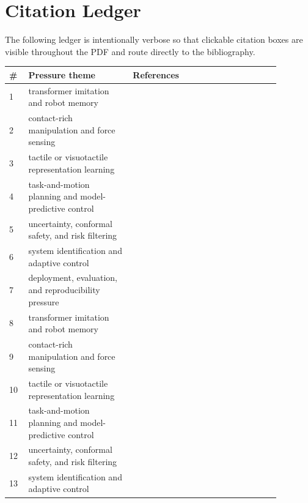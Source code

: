 \documentclass{article}
\begin{document}
\section{Citation Ledger}
The following ledger is intentionally verbose so that clickable citation boxes are visible throughout the PDF and route directly to the bibliography.
\begin{longtable}{p{0.06\linewidth}p{0.34\linewidth}p{0.48\linewidth}}
\toprule
\# & Pressure theme & References \\
\midrule
1 & transformer imitation and robot memory & \citep{wang2022sgeitl1,shen2024vmetransformer2,fang2019scene3} \\
2 & contact-rich manipulation and force sensing & \citep{li2025gppt4,li2023transformer5,yang2022scene6} \\
3 & tactile or visuotactile representation learning & \citep{fan2024embodied7,wang2023hscnet8,dominguezvidal2024exploring9} \\
4 & task-and-motion planning and model-predictive control & \citep{hoffmann2017cloudedge10,zhong2023accurate11,hollingworth2006scene12} \\
5 & uncertainty, conformal safety, and risk filtering & \citep{hollingworth2005the13,zhou2024care14,khan2026zerorel15} \\
6 & system identification and adaptive control & \citep{yang2023neural16,wu2022masked17,yan2026meap18} \\
7 & deployment, evaluation, and reproducibility pressure & \citep{marneweck2018neural19,li2018semantic20,sun2023superpoint21} \\
8 & transformer imitation and robot memory & \citep{yamazaki2023vltint22,yang2025swin3d23,rebai2012bioinspired24} \\
9 & contact-rich manipulation and force sensing & \citep{decoteau2009effects25,edwardsndthe26,hu2024research27} \\
10 & tactile or visuotactile representation learning & \citep{luo2025research28,dong2025development29,xu2022visual30} \\
11 & task-and-motion planning and model-predictive control & \citep{ji2021visual31,lee2020audiovisual32,cao2023scenegate33} \\
12 & uncertainty, conformal safety, and risk filtering & \citep{zhao2022a34,kim2023hiint35,urrea2024enhancing36} \\
13 & system identification and adaptive control & \citep{holzschuh2025pdetransformer37,zhu2025move38,lu2026gsmem39} \\

\end{longtable}
\end{document}
